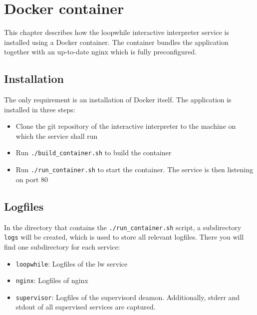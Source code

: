 \chapter{Docker container}
\label{chapter:docker}
This chapter describes how the loopwhile interactive interpreter service
is installed using a Docker container. The container bundles the application
together with an up-to-date nginx which is fully preconfigured.


\section{Installation}
The only requirement is an installation of Docker itself.
The application is installed in three steps:
\begin{itemize}
\item Clone the git repository of the interactive interpreter to the machine
      on which the service shall run
\item Run \verb|./build_container.sh| to build the container
\item Run \verb|./run_container.sh| to start the container. The service is then
      listening on port 80
\end{itemize}



\section{Logfiles}
In the directory that contains the \verb|./run_container.sh| script, a subdirectory
\verb|logs| will be created, which is used to store all relevant logfiles. There
you will find one subdirectory for each service:
\begin{itemize}
\item \verb|loopwhile|: Logfiles of the lw service
\item \verb|nginx|: Logfiles of nginx
\item \verb|supervisor|: Logfiles of the supervisord deamon. Additionally,
      stderr and stdout of all supervised services are captured.
\end{itemize}
